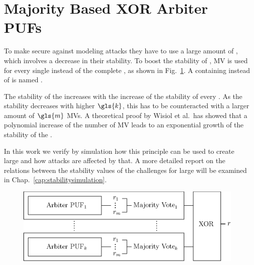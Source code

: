 
\section{Majority Based XOR Arbiter PUFs}
\label{sec:majorityxorarbiter}

To make \xpufs secure against modeling attacks they have to use a large amount of \apufs, which involves a decrease in their stability.
To boost the stability of \xpufs, \ac{MV} is used for every single \apuf instead of the complete \xpuf, as shown in Fig.\ \ref{fig:majorityxorarbiter}.
A \xpuf containing \mpufs instead of \apufs is named \mxpuf.

The stability of the \xpuf increases with the increase of the stability of every \mpuf.
As the stability decreases with higher $\gls{k}$, this has to be counteracted with a larger amount of $\gls{m}$ \acp{MV}.
A theoretical proof by Wisiol et al.\ has showed that a polynomial increase of the number of \ac{MV} leads to an exponential growth of the stability of the \mxpuf \cite{Wisiol2017WhyPUFs}.

In this work we verify by simulation how this principle can be used to create large \mxpufs and how attacks are affected by that.
A more detailed report on the relations between the stability values of the challenges for large \mxpufs will be examined in Chap.\ \ref{cap:stabilitysimulation}.

\vspace{0.25cm}
\begin{figure}[ht]
\centering
\includegraphics[width=1.00\textwidth]{images/majority_xor_arbiter_v2.eps}
\caption[Majority \acs{XOR} \apuf]{\mxpuf}
\label{fig:majorityxorarbiter}
\end{figure}

